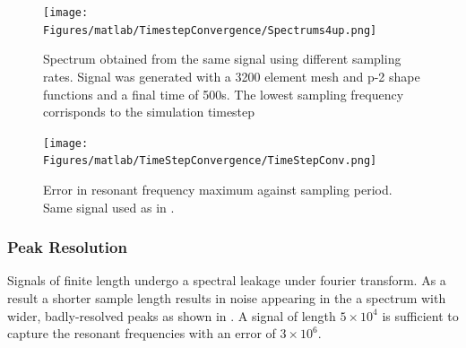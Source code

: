 
\begin{figure}
\texttt{[image: Figures/matlab/TimestepConvergence/Spectrums4up.png]}
\caption{Spectrum obtained from the same signal using different sampling rates. Signal was generated with a 3200 element mesh and p-2 shape functions and a final time of 500s. The lowest sampling frequency corrisponds to the simulation timestep}
\label{Timestep1}
\end{figure}


\begin{figure}
\texttt{[image: Figures/matlab/TimeStepConvergence/TimeStepConv.png]}
\caption{Error in resonant frequency maximum against sampling period. Same signal used as in .}
\label{Timestep01}
\end{figure}



\subsubsection{Peak Resolution}
Signals of finite length undergo a spectral leakage under fourier transform. As a result a shorter sample length results in noise appearing in the a spectrum with wider, badly-resolved peaks as shown in . A signal of length $5 \times 10^4$ is sufficient to capture the resonant frequencies with an error of $3 \times 10^6$.

